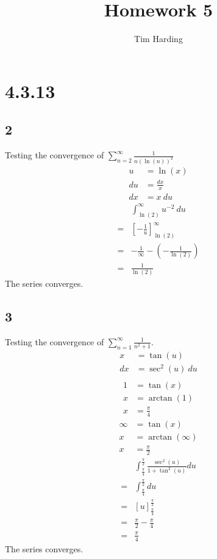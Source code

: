 \documentclass[12pt]{article}
\title{Homework 5}
\author{Tim Harding}
\newcommand{\round}[1]{\left(       #1 \right)      }
\newcommand{\hard} [1]{\left[       #1 \right]      }
\begin{document}
\maketitle

\section*{4.3.13}

\subsection*{2}
Testing the convergence of $\sum_{n=2}^\infty \frac{1}{n (\ln(n))^2}$
\begin{align*}
    u &= \ln(x) \\
    du &= \frac{dx}{x} \\
    dx &= x\ du
\end{align*}
\begin{align*}
     & \int_{\ln(2)}^\infty u^{-2}\ du \\
    =& \hard{-\frac{1}{u}}_{\ln(2)}^\infty \\
    =& -\frac{1}{\infty} - \round{-\frac{1}{\ln(2)}} \\
    =& \frac{1}{\ln(2)}
\end{align*}
The series converges.



\subsection*{3}
Testing the convergence of $\sum_{n=1}^\infty \frac{1}{n^2 + 1}$.
\begin{align*}
    x &= \tan(u) \\
    dx &= \sec^2(u)\ du \\
\end{align*}
\begin{align*}
    1 &= \tan(x) \\
    x &= \arctan(1) \\
    x &= \frac{\pi}{4}
\end{align*}
\begin{align*}
    \infty &= \tan(x) \\
    x &= \arctan(\infty) \\
    x &= \frac{\pi}{2}
\end{align*}
\begin{align*}
     & \int_\frac{\pi}{4}^\frac{\pi}{2} \frac{\sec^2(u)}{1 + \tan^2(u)} du \\
    =& \int_\frac{\pi}{4}^\frac{\pi}{2} du \\
    =& \hard{u}_{\frac{\pi}{4}}^\frac{\pi}{2} \\
    =& \frac{\pi}{2} - \frac{\pi}{4} \\
    =& \frac{\pi}{4}
\end{align*}
The series converges.
\end{document}

